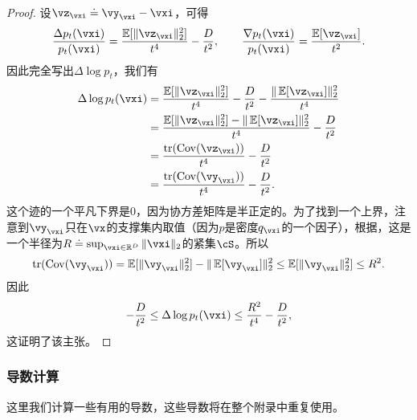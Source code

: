 \documentclass[../../book-main_zh.tex]{subfiles}
\begin{document}
\begin{proof}
    设\(\vz_{\vxi} \doteq \vy_{\vxi} - \vxi\)，可得
    \begin{equation}
        \frac{\Delta p_{t}(\vxi)}{p_{t}(\vxi)} = \frac{\Ex[\norm{\vz_{\vxi}}_{2}^{2}]}{t^{4}} - \frac{D}{t^{2}}, \qquad \frac{\nabla p_{t}(\vxi)}{p_{t}(\vxi)} = \frac{\Ex[\vz_{\vxi}]}{t^{2}}.
    \end{equation}
    因此完全写出\(\Delta \log p_{t}\)，我们有
    \begin{align}
        \Delta \log p_{t}(\vxi)
        &= \frac{\Ex[\norm{\vz_{\vxi}}_{2}^{2}]}{t^{4}} - \frac{D}{t^{2}} - \frac{\norm{\Ex[\vz_{\vxi}]}_{2}^{2}}{t^{4}} \\
        &= \frac{\Ex[\norm{\vz_{\vxi}}_{2}^{2}] - \norm{\Ex[\vz_{\vxi}]}_{2}^{2}}{t^{4}} - \frac{D}{t^{2}} \\
        &= \frac{\tr(\Cov(\vz_{\vxi}))}{t^{4}} - \frac{D}{t^{2}} \\
        &= \frac{\tr(\Cov(\vy_{\vxi}))}{t^{4}} - \frac{D}{t^{2}}.
    \end{align}
    这个迹的一个平凡下界是\(0\)，因为协方差矩阵是半正定的。为了找到一个上界，注意到\(\vy_{\vxi}\)只在\(\vx\)的支撑集内取值（因为\(p\)是密度\(q_{\vxi}\)的一个因子），根据，这是一个半径为\(R \doteq \sup_{\vxi \in \R^{D}}\norm{\vxi}_{2}\)的紧集\(\cS\)。所以
    \begin{equation}
        \tr(\Cov(\vy_{\vxi})) = \Ex[\norm{\vy_{\vxi}}_{2}^{2}] - \norm{\Ex[\vy_{\vxi}]}_{2}^{2} \leq \Ex[\norm{\vy_{\vxi}}_{2}^{2}] \leq R^{2}.
    \end{equation}
    因此
    \begin{equation}
        -\frac{D}{t^{2}} \leq \Delta \log p_{t}(\vxi) \leq \frac{R^{2}}{t^{4}} - \frac{D}{t^{2}},
    \end{equation}
    这证明了该主张。
\end{proof}

\subsubsection{导数计算}

这里我们计算一些有用的导数，这些导数将在整个附录中重复使用。
\end{document}
